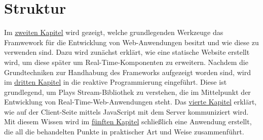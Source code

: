\section{Struktur} %
\label{sec:struktur}

Im \hyperref[cha:grundlagen]{zweiten Kapitel} wird gezeigt, welche grundlegenden Werkzeuge das Framwework für die Entwicklung von Web-Anwendungen besitzt und wie diese zu verwenden sind.
Dazu wird zunächst erklärt, wie eine statische Website erstellt wird, um diese später um Real-Time-Komponenten zu erweitern.
Nachdem die Grundtechniken zur Handhabung des Frameworks aufgezeigt worden sind, wird im \hyperref[cha:reaktive_programmierung]{dritten Kapitel} in die reaktive Programmierung eingeführt.
Diese ist grundlegend, um Plays Stream-Bibliothek zu verstehen, die im Mittelpunkt der Entwicklung von Real-Time-Web-Anwendungen steht.
Das \hyperref[cha:real_time_web]{vierte Kapitel} erklärt, wie auf der Client-Seite mittels JavaScript mit dem Server kommuniziert wird.
Mit diesem Wissen wird im \hyperref[cha:anwendung]{fünften Kapitel} schließlich eine Anwendung erstellt, die all die behandelten Punkte in praktischer Art und Weise zusammenführt.



